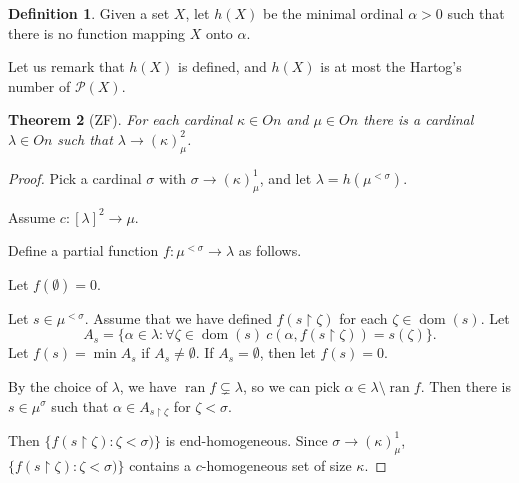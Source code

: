 \documentclass[a4paper,10pt,reqno]{amsart}
\numberwithin{equation}{section}
\newtheorem{theorem}{Theorem}[section]
\theoremstyle{definition}
\newtheorem{definition}[theorem]{Definition}
\theoremstyle{remark}
\newcommand{\mc}[1]{\mathcal{#1}}
\newcommand{\setm}{\setminus}
\newcommand{\empt}{\emptyset}
\newcommand{\dom}{\operatorname{dom}}
\newcommand{\ran}{\operatorname{ran}}
\begin{document}
    

  


\begin{definition}\label{df:Hnew}
    Given a set  $X$, let 
    $h(X)$ be the minimal ordinal ${\alpha}>0$ such that 
    there is no function mapping $X$ onto ${\alpha}$.
    \end{definition}

 Let us remark that $h(X)$ is defined, and  $h(X)$ is at most the 
 Hartog's number of $\mc P(X)$.   

    \begin{theorem}[ZF]\label{tm:er}
        For each cardinal ${\kappa}\in On$ and ${\mu}\in On$ there is a cardinal ${\lambda}\in On$
        such that ${\lambda}\to ({\kappa})^2_{\mu}$.
            \end{theorem}
            
        \begin{proof}
    Pick a cardinal ${\sigma}$ with ${\sigma}\to ({\kappa})^1_{\mu}$, and let 
    ${\lambda}=h({\mu}^{<{\sigma}})$.
    
            Assume $c:{[{\lambda}]}^{2}\to {\mu}$.
        
        
        Define a partial function $f:{\mu}^{<{\sigma}}\to {\lambda}$ as follows.
        
        Let $f(\empt)=0$.
        
        Let $s\in {\mu}^{<{\sigma}}$. Assume that we have defined $f(s\restriction {\zeta})$ for each ${\zeta}\in \dom(s)$.
        Let  
        \begin{displaymath}
        A_s=\{{\alpha}\in {\lambda}: \forall {\zeta}\in \dom(s)\ c({\alpha},f(s\restriction {\zeta}))=s({\zeta})\}.
        \end{displaymath}
        Let $f(s)=\min  A_s$ if $A_s\ne \empt$. If $A_s=\empt$, then let $f(s)=0$. 
        
        By the choice of ${\lambda}$, we have 
        $\ran f\subsetneq  {\lambda}$, so we can pick 
         ${\alpha}\in {\lambda}\setm \ran f$.
        Then there is $s\in {\mu}^{\sigma}$ such that ${\alpha}\in A_{s\restriction {\zeta}}$ for ${\zeta}<{\sigma}$.
        
        Then $\{f(s\restriction {\zeta}):{\zeta}<{\sigma})\}$ is end-homogeneous.
       Since ${\sigma}\to ({\kappa})^1_{\mu}$, $\{f(s\restriction {\zeta}):{\zeta}<{\sigma})\}$
       contains a $c$-homogeneous set  of size ${\kappa}$.
        \end{proof}
        
\end{document}
